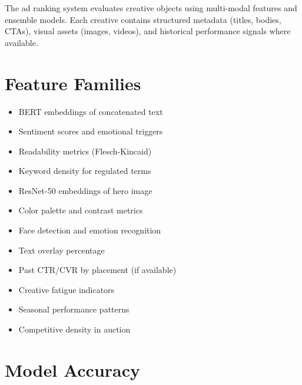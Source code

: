 \documentclass[11pt,a4paper]{report}
\begin{document}
The ad ranking system evaluates creative objects using multi-modal features and ensemble models. Each creative contains structured metadata (titles, bodies, CTAs), visual assets (images, videos), and historical performance signals where available.

\section{Feature Families}

\begin{metricbox}
\begin{itemize}
    \item BERT embeddings of concatenated text
    \item Sentiment scores and emotional triggers
    \item Readability metrics (Flesch-Kincaid)
    \item Keyword density for regulated terms
\end{itemize}
\end{metricbox}

\begin{metricbox}
\begin{itemize}
    \item ResNet-50 embeddings of hero image
    \item Color palette and contrast metrics
    \item Face detection and emotion recognition
    \item Text overlay percentage
\end{itemize}
\end{metricbox}

\begin{metricbox}
\begin{itemize}
    \item Past CTR/CVR by placement (if available)
    \item Creative fatigue indicators
    \item Seasonal performance patterns
    \item Competitive density in auction
\end{itemize}
\end{metricbox}

\section{Model Accuracy}
\end{document}
